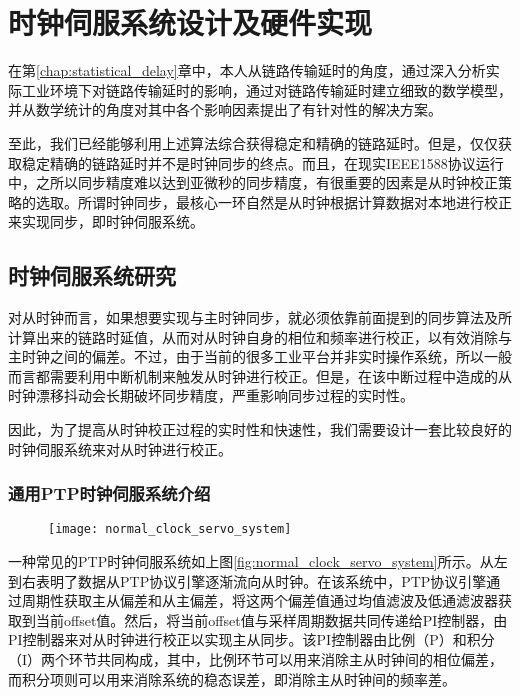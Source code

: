 
\chapter{时钟伺服系统设计及硬件实现}
在第\ref{chap:statistical_delay}章中，本人从链路传输延时的角度，通过深入分析实际工业环境下对链路传输延时的影响，通过对链路传输延时建立细致的数学模型，并从数学统计的角度对其中各个影响因素提出了有针对性的解决方案。

至此，我们已经能够利用上述算法综合获得稳定和精确的链路延时。但是，仅仅获取稳定精确的链路延时并不是时钟同步的终点。而且，在现实IEEE1588协议运行中，之所以同步精度难以达到亚微秒的同步精度，有很重要的因素是从时钟校正策略的选取。所谓时钟同步，最核心一环自然是从时钟根据计算数据对本地进行校正来实现同步，即时钟伺服系统。

\section{时钟伺服系统研究}
对从时钟而言，如果想要实现与主时钟同步，就必须依靠前面提到的同步算法及所计算出来的链路时延值，从而对从时钟自身的相位和频率进行校正，以有效消除与主时钟之间的偏差。不过，由于当前的很多工业平台并非实时操作系统，所以一般而言都需要利用中断机制来触发从时钟进行校正。但是，在该中断过程中造成的从时钟漂移抖动会长期破坏同步精度，严重影响同步过程的实时性。

因此，为了提高从时钟校正过程的实时性和快速性，我们需要设计一套比较良好的时钟伺服系统来对从时钟进行校正。

\subsection{通用PTP时钟伺服系统介绍}

\begin{figure}[!hbp]
  \centering
  \begin{minipage}[b]{0.7\textwidth}
    \captionstyle{\centering}
    \centering
    \texttt{[image: normal\_clock\_servo\_system]}
  \end{minipage}     
\end{figure}

一种常见的PTP时钟伺服系统如上图\ref{fig:normal_clock_servo_system}所示。从左到右表明了数据从PTP协议引擎逐渐流向从时钟。在该系统中，PTP协议引擎通过周期性获取主从偏差和从主偏差，将这两个偏差值通过均值滤波及低通滤波器获取到当前offset值。然后，将当前offset值与采样周期数据共同传递给PI控制器，由PI控制器来对从时钟进行校正以实现主从同步。该PI控制器由比例（P）和积分（I）两个环节共同构成，其中，比例环节可以用来消除主从时钟间的相位偏差，而积分项则可以用来消除系统的稳态误差，即消除主从时钟间的频率差。

